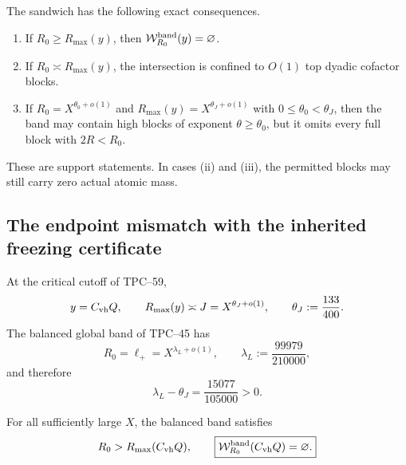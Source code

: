 \begin{corollary}
\label{cor:band-three-regimes}
The sandwich has the following exact consequences.
\begin{enumerate}[label=\textup{(\roman*)},leftmargin=3em]
 \item If \(R_0\ge R_{\max}(y)\), then
       \(\mathcal W_{R_0}^{\rm band}(y)=\varnothing\).
 \item If \(R_0\asymp R_{\max}(y)\), the intersection is confined to
       \(O(1)\) top dyadic cofactor blocks.
 \item If \(R_0=X^{\theta_0+o(1)}\) and
       \(R_{\max}(y)=X^{\theta_J+o(1)}\) with
       \(0\le\theta_0<\theta_J\), then the band may contain high blocks
       of exponent \(\theta\ge\theta_0\), but it omits every full block
       with \(2R<R_0\).
\end{enumerate}
These are support statements.  In cases \textup{(ii)} and \textup{(iii)},
the permitted blocks may still carry zero actual atomic mass.
\end{corollary}

\subsection{The endpoint mismatch with the inherited freezing certificate}

At the critical cutoff of TPC--59,
\begin{equation}
 y=C_{\rm vh}Q,
 \qquad
 R_{\max}(y)\asymp J
 =X^{\theta_J+o(1)},
 \qquad
 \theta_J:=\frac{133}{400}.
 \label{eq:band-critical-ceiling}
\end{equation}
The balanced global band of TPC--45 has
\begin{equation}
 R_0=\ell_+
 =X^{\lambda_L+o(1)},
 \qquad
 \lambda_L:=\frac{99979}{210000},
 \label{eq:band-balanced-R0}
\end{equation}
and therefore
\begin{equation}
 \lambda_L-\theta_J
 =\frac{15077}{105000}>0.
 \label{eq:band-balanced-critical-gap}
\end{equation}

\begin{corollary}
\label{cor:band-balanced-empty}
For all sufficiently large \(X\), the balanced band satisfies
\begin{equation}
 R_0>R_{\max}(C_{\rm vh}Q),
 \qquad
 \boxed{\mathcal W_{R_0}^{\rm band}(C_{\rm vh}Q)=\varnothing.}
 \label{eq:band-balanced-empty}
\end{equation}
\end{corollary}

